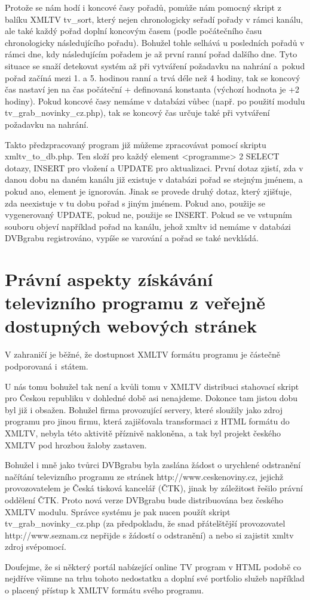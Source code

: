 Protože se nám hodí i koncové časy pořadů, pomůže nám pomocný skript z balíku XMLTV tv\_sort, který nejen chronologicky seřadí pořady v rámci kanálu, ale také každý pořad doplní koncovým časem (podle počátečního času chronologicky následujícího pořadu). Bohužel tohle selhává u posledních pořadů v rámci dne, kdy následujícím pořadem je až první ranní pořad dalšího dne. Tyto situace se snaží detekovat systém až při vytváření požadavku na nahrání a~pokud pořad začíná mezi 1. a 5. hodinou ranní a trvá déle než 4 hodiny, tak se koncový čas nastaví jen na čas počáteční + definovaná konstanta (výchozí hodnota je +2 hodiny). Pokud koncové časy nemáme v databázi vůbec (např. po použití modulu tv\_grab\_novinky\_cz.php), tak se koncový čas určuje také při vytváření požadavku na nahrání.

Takto předzpracovaný program již můžeme zpracovávat pomocí skriptu xmltv\_to\_db.php. Ten složí pro každý element <programme> 2 SELECT dotazy, INSERT pro vložení a UPDATE pro aktualizaci. První dotaz zjistí, zda v danou dobu na daném kanálu již existuje v databázi pořad se stejným jménem, a pokud ano, element je ignorován. Jinak se provede druhý dotaz, který zjišťuje, zda neexistuje v tu dobu pořad s jiným jménem. Pokud ano, použije se vygenerovaný UPDATE, pokud ne, použije se INSERT. Pokud se ve vstupním souboru objeví například pořad na kanálu, jehož xmltv id nemáme v databázi DVBgrabu registrováno, vypíše se varování a pořad se také nevkládá.

\section{Právní aspekty získávání televizního programu z veřejně dostupných webových stránek}
V zahraničí je běžné, že dostupnost XMLTV formátu programu je částečně podporovaná i~státem. 

U nás tomu bohužel tak není a kvůli tomu v XMLTV distribuci stahovací skript pro Českou republiku v dohledné době asi nenajdeme. Dokonce tam jistou dobu byl již i obsažen. Bohužel firma provozující servery, které sloužily jako zdroj programu pro jinou firmu, která zajišťovala transformaci z HTML formátu do XMLTV, nebyla této aktivitě příznivě nakloněna, a tak byl projekt českého XMLTV pod hrozbou žaloby zastaven.

Bohužel i mně jako tvůrci DVBgrabu byla zaslána žádost o urychlené odstranění načítání televizního programu ze stránek http://www.ceskenoviny.cz, jejichž provozovatelem je Česká tisková kancelář (ČTK), jinak by záležitost řešilo právní oddělení ČTK. Proto nová verze DVBgrabu bude distribuována bez českého XMLTV modulu. Správce systému je pak nucen použít skript tv\_grab\_novinky\_cz.php (za předpokladu, že snad přátelštější provozovatel http://www.seznam.cz nepřijde s žádostí o odstranění) a nebo si zajistit xmltv zdroj svépomocí.

Doufejme, že si některý portál nabízející online TV program v HTML podobě co nejdříve všimne na trhu tohoto nedostatku a doplní své portfolio služeb například o placený přístup k XMLTV formátu svého programu.
\vfill
